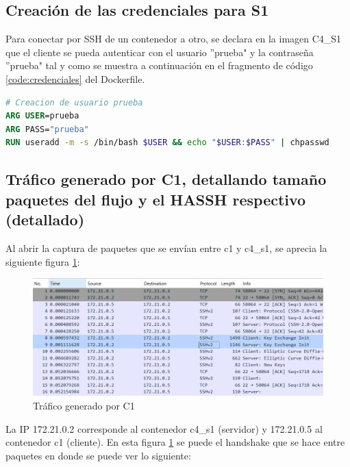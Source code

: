 \documentclass[letter,12pt]{article}
\newcounter{codecount}
\begin{document}
\clearpage

\subsection{Creación de las credenciales para S1}

Para conectar por SSH de un contenedor a otro, se declara en la imagen C4\_S1 que el cliente se pueda autenticar con el usuario ''prueba" y la contraseña ''prueba" tal y como se muestra a continuación en el fragmento de código \ref{code:credenciales} del Dockerfile.

\label{code:credenciales}
\begin{lstlisting}[language=Dockerfile, caption={Fragmento del Dockerfile en el código \ref{code:C4} de c4\_s1 con las credenciales. }]
# Creacion de usuario prueba
ARG USER=prueba
ARG PASS="prueba"
RUN useradd -m -s /bin/bash $USER && echo "$USER:$PASS" | chpasswd
\end{lstlisting}


\subsection{Tráfico generado por C1, detallando tamaño paquetes del flujo y el HASSH respectivo (detallado)}

Al abrir la captura de paquetes que se envían entre c1 y c4\_s1, se aprecia la siguiente figura \ref{fig:trafico_c1}:

\begin{figure}[ht]
    \centering
    \includegraphics[width=1\linewidth]{Images/parte1/trafico_c1.png}
    \caption{Tráfico generado por C1}
    \label{fig:trafico_c1}
\end{figure}

La IP 172.21.0.2 corresponde al contenedor c4\_s1 (servidor) y 172.21.0.5 al contenedor c1 (cliente). En esta figura \ref{fig:trafico_c1} se puede el handshake que se hace entre paquetes en donde se puede ver lo siguiente:
\end{document}
